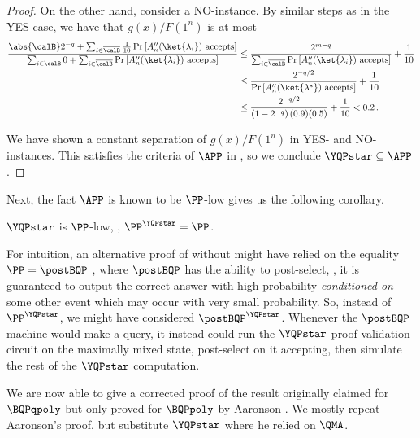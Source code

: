 \begin{proof}
	On the other hand, consider a NO-instance.
	By similar steps as in the YES-case,
	we have that $g(x)/F(1^n)$ is at most
	\begin{align*}
		\frac{
			\abs{\calB} 2^{-q} + \sum_{i\in\overline{\calB}}
			\frac{1}{10} \Pr\left[A''_n(\ket{\lambda_i})\text{ accepts}\right]
		}
		{
			\sum_{i\in \calB} 0 + \sum_{i\in \overline{\calB}} \Pr\left[A''_n(\ket{\lambda_i})\text{ accepts}\right]
		}
		&\leq
		\frac{2^{m-q}}
		{\sum_{i\in \overline{\calB}} \Pr\left[A''_n(\ket{\lambda_i})
			\text{ accepts}\right]
		}
		+
		\frac{1}{10} \\
		&\leq
		\frac{2^{-q/2}}{\Pr\left[A''_n(\ket{\lambda^*})\text{ accepts}\right]} + \frac{1}{10}	\\
		&
		\leq \frac{2^{-q/2} }{\left(1-2^{-q}\right) (0.9) (0.5)} + \frac{1}{10}
		< 0.2	\, .
	\end{align*}
	
	We have shown a constant separation of $g(x)/F(1^n)$ in YES- and NO-instances.
	This satisfies the criteria of $\APP$ in ,
	so we conclude $\YQPstar\subseteq \APP$.
\end{proof}

Next, the fact $\APP$ is known to be $\PP$-low \cite[Theorem 6.4.14]{li1993counting}
gives us the following corollary.

\begin{corollary}\label{corr:YQPisLow}
	$\YQPstar$ is $\PP$-low, \ie{}, $\PP^{\YQPstar}=\PP$.
\end{corollary}

For intuition, an alternative proof of  without  
might have relied
on the equality $\PP=\postBQP$ \cite{aaronson2005quantum},
where $\postBQP$ has the ability to post-select, \ie{}, it is guaranteed to output
the correct answer with high probability \emph{conditioned on} some other event
which may occur with very small probability.
So, instead of $\PP^\YQPstar$, we might have considered $\postBQP^\YQPstar$.
Whenever the $\postBQP$ machine would make a query, it instead could
run the $\YQPstar$ proof-validation circuit on
the maximally mixed state, post-select on it accepting,
then simulate the rest of the $\YQPstar$ computation.

We are now able to give a corrected proof of the result originally claimed for
$\BQPqpoly$ but only proved for $\BQPpoly$ by Aaronson \cite{aaronson_subtle}.
We mostly repeat Aaronson's proof, but substitute $\YQPstar$ where he relied on $\QMA$.

